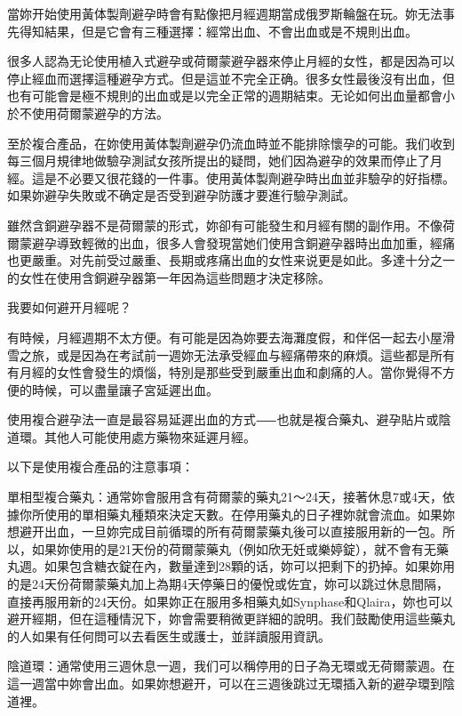 \documentclass[12pt,UTF8]{ctexbook}
\begin{document}
當妳开始使用黃体製劑避孕時會有點像把月經週期當成俄罗斯輪盤在玩。妳无法事先得知結果，但是它會有三種選擇：經常出血、不會出血或是不規則出血。

很多人認為无论使用植入式避孕或荷爾蒙避孕器來停止月經的女性，都是因為可以停止經血而選擇這種避孕方式。但是這並不完全正确。很多女性最後沒有出血，但也有可能會是極不規則的出血或是以完全正常的週期結束。无论如何出血量都會小於不使用荷爾蒙避孕的方法。

至於複合產品，在妳使用黃体製劑避孕仍流血時並不能排除懷孕的可能。我们收到每三個月規律地做驗孕測試女孩所提出的疑問，她们因為避孕的效果而停止了月經。這是不必要又很花錢的一件事。使用黃体製劑避孕時出血並非驗孕的好指標。如果妳避孕失敗或不确定是否受到避孕防護才要進行驗孕測試。

雖然含銅避孕器不是荷爾蒙的形式，妳卻有可能發生和月經有關的副作用。不像荷爾蒙避孕導致輕微的出血，很多人會發現當她们使用含銅避孕器時出血加重，經痛也更嚴重。对先前受过嚴重、長期或疼痛出血的女性来说更是如此。多達十分之一的女性在使用含銅避孕器第一年因為這些問題才決定移除。





我要如何避开月經呢？




有時候，月經週期不太方便。有可能是因為妳要去海灘度假，和伴侶一起去小屋滑雪之旅，或是因為在考試前一週妳无法承受經血与經痛帶來的麻煩。這些都是所有有月經的女性會發生的煩惱，特別是那些受到嚴重出血和劇痛的人。當你覺得不方便的時候，可以盡量讓子宮延遲出血。

使用複合避孕法一直是最容易延遲出血的方式⸺也就是複合藥丸、避孕貼片或陰道環。其他人可能使用處方藥物來延遲月經。



以下是使用複合產品的注意事項：



單相型複合藥丸：通常妳會服用含有荷爾蒙的藥丸21〜24天，接著休息7或4天，依據你所使用的單相藥丸種類來決定天數。在停用藥丸的日子裡妳就會流血。如果妳想避开出血，一旦妳完成目前循環的所有荷爾蒙藥丸後可以直接服用新的一包。所以，如果妳使用的是21天份的荷爾蒙藥丸（例如欣无妊或樂婷錠），就不會有无藥丸週。如果包含糖衣錠在內，數量達到28顆的话，妳可以把剩下的扔掉。如果妳用的是24天份荷爾蒙藥丸加上為期4天停藥日的優悅或佐宜，妳可以跳过休息間隔，直接再服用新的24天份。如果妳正在服用多相藥丸如Synphase和Qlaira，妳也可以避开經期，但在這種情況下，妳會需要稍微更詳細的說明。我们鼓勵使用這些藥丸的人如果有任何問可以去看医生或護士，並詳讀服用資訊。

陰道環：通常使用三週休息一週，我们可以稱停用的日子為无環或无荷爾蒙週。在這一週當中妳會出血。如果妳想避开，可以在三週後跳过无環插入新的避孕環到陰道裡。
\end{document}
